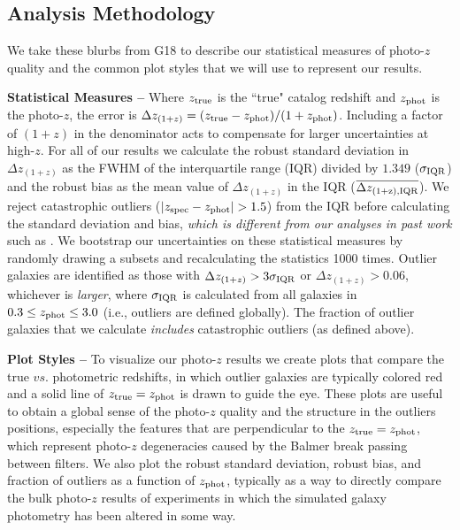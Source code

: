 \subsection{Analysis Methodology}\label{ssec:pz_exp_meth}

We take these blurbs from G18 to describe our statistical measures of photo-$z$ quality and the common plot styles that we will use to represent our results.

{\bf Statistical Measures --} Where $z_{\rm true}$ is the ``true" catalog redshift and $z_{\rm phot}$ is the photo-$z$, the error is $\Delta z_{(1+z)} = (z_{\rm true} - z_{\rm phot})/(1+z_{\rm phot})$. Including a factor of $(1+z)$ in the denominator acts to compensate for larger uncertainties at high-$z$. For all of our results we calculate the robust standard deviation in $\Delta z_{(1+z)}$ as the FWHM of the interquartile range (IQR) divided by $1.349$ ($\sigma_{\rm IQR}$) and the robust bias as the mean value of $\Delta z_{(1+z)}$ in the IQR ($\overline{\Delta z_{\rm(1+z), IQR}}$). We reject catastrophic outliers ($|z_{\rm spec}-z_{\rm phot}| > 1.5$) from the IQR before calculating the standard deviation and bias, {\em which is different from our analyses in past work} such as \cite{2018AJ....155....1G}. We bootstrap our uncertainties on these statistical measures by randomly drawing a subsets and recalculating the statistics 1000 times. Outlier galaxies are identified as those with $\Delta z_{(1+z)} > 3\sigma_{\rm IQR}$ or $\Delta z_{(1+z)} > 0.06$, whichever is {\it larger}, where $\sigma_{\rm IQR}$ is calculated from all galaxies in $0.3 \leq z_{\rm phot} \leq 3.0$ (i.e., outliers are defined globally). The fraction of outlier galaxies that we calculate {\it includes} catastrophic outliers (as defined above).

{\bf Plot Styles --} To visualize our photo-$z$ results we create plots that compare the true $vs.$ photometric redshifts, in which outlier galaxies are typically colored red and a solid line of $z_{\rm true} = z_{\rm phot}$ is drawn to guide the eye. These plots are useful to obtain a global sense of the photo-$z$ quality and the structure in the outliers positions, especially the features that are perpendicular to the $z_{\rm true} = z_{\rm phot}$, which represent photo-$z$ degeneracies caused by the Balmer break passing between filters. We also plot the robust standard deviation, robust bias, and fraction of outliers as a function of $z_{\rm phot}$, typically as a way to directly compare the bulk photo-$z$ results of experiments in which the simulated galaxy photometry has been altered in some way. 

